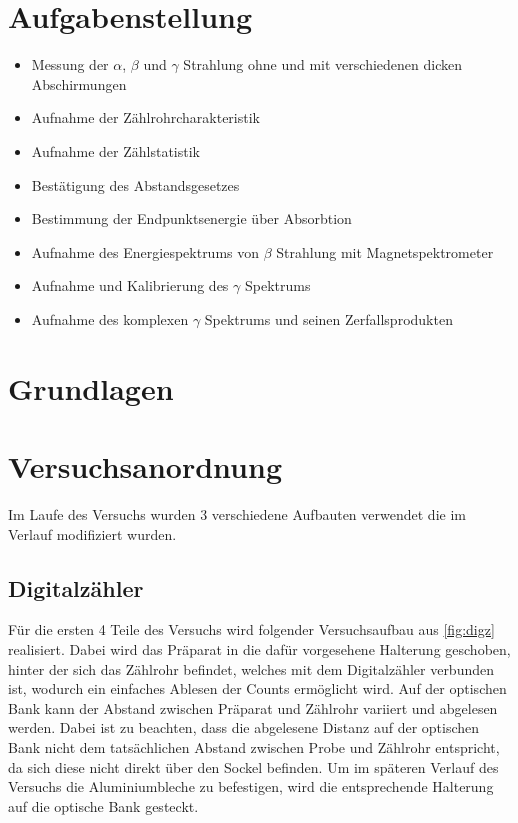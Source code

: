 \documentclass[12pt,english,ngerman]{scrartcl}
\begin{document}
%
\tableofcontents
\newpage

\section{Aufgabenstellung\label{Auf}}

\begin{itemize}
    \item Messung der $\alpha$, $\beta$ und $\gamma$ Strahlung ohne und mit verschiedenen dicken Abschirmungen
    \item Aufnahme der Zählrohrcharakteristik
    \item Aufnahme der Zählstatistik
    \item Bestätigung des Abstandsgesetzes
    \item Bestimmung der Endpunktsenergie über Absorbtion
    \item Aufnahme des Energiespektrums von $\beta$ Strahlung mit Magnetspektrometer
    \item Aufnahme und Kalibrierung des $\gamma$ Spektrums
    \item Aufnahme des komplexen $\gamma$ Spektrums und seinen Zerfallsprodukten
\end{itemize}

\section{Grundlagen}\label{Grund}


\section{Versuchsanordnung}\label{sec:Versuchsanordnung}

Im Laufe des Versuchs wurden 3 verschiedene Aufbauten verwendet die im Verlauf modifiziert wurden.

\subsection{Digitalzähler}\label{aufbau_Digz}

Für die ersten 4 Teile des Versuchs wird folgender Versuchsaufbau aus \autoref{fig:digz} realisiert.
Dabei wird das Präparat in die dafür vorgesehene Halterung geschoben, hinter der sich das Zählrohr befindet, 
welches mit dem Digitalzähler verbunden ist, wodurch ein einfaches Ablesen der Counts ermöglicht wird.
Auf der optischen Bank kann der Abstand zwischen Präparat und Zählrohr variiert und abgelesen werden.
Dabei ist zu beachten, dass die abgelesene Distanz auf der optischen Bank nicht dem tatsächlichen Abstand zwischen 
Probe und Zählrohr entspricht, da sich diese nicht direkt über den Sockel befinden. Um im späteren Verlauf des Versuchs die 
Aluminiumbleche zu befestigen, wird die entsprechende Halterung auf die optische Bank gesteckt.
\end{document}
